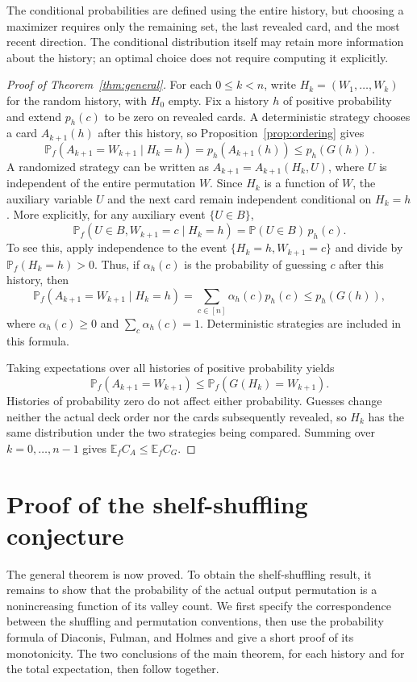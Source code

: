 \documentclass[11pt,reqno]{amsart}
\numberwithin{equation}{section}
\theoremstyle{definition}
\theoremstyle{remark}
\begin{document}
The conditional probabilities are defined using the entire history, but choosing a maximizer requires only the remaining set, the last revealed card, and the most recent direction. The conditional distribution itself may retain more information about the history; an optimal choice does not require computing it explicitly.

\begin{proof}[Proof of Theorem~\ref{thm:general}]
For each $0\le k<n$, write $H_k=(W_1,\ldots,W_k)$ for the random history, with $H_0$ empty. Fix a history $h$ of positive probability and extend $p_h(c)$ to be zero on revealed cards. A deterministic strategy chooses a card $A_{k+1}(h)$ after this history, so Proposition~\ref{prop:ordering} gives
\[
 \mathbb P_f(A_{k+1}=W_{k+1}\mid H_k=h)
 =p_h(A_{k+1}(h))\le p_h(G(h)).
\]
A randomized strategy can be written as $A_{k+1}=A_{k+1}(H_k,U)$, where $U$ is independent of the entire permutation $W$. Since $H_k$ is a function of $W$, the auxiliary variable $U$ and the next card remain independent conditional on $H_k=h$. More explicitly, for any auxiliary event $\{U\in B\}$,
\[
 \mathbb P_f(U\in B,W_{k+1}=c\mid H_k=h)
 =\mathbb P(U\in B)\,p_h(c).
\]
To see this, apply independence to the event $\{H_k=h,W_{k+1}=c\}$ and divide by $\mathbb P_f(H_k=h)>0$. Thus, if $\alpha_h(c)$ is the probability of guessing $c$ after this history, then
\[
 \mathbb P_f(A_{k+1}=W_{k+1}\mid H_k=h)
 =\sum_{c\in[n]}\alpha_h(c)p_h(c)
 \le p_h(G(h)),
\]
where $\alpha_h(c)\ge0$ and $\sum_c\alpha_h(c)=1$. Deterministic strategies are included in this formula.

Taking expectations over all histories of positive probability yields
\[
 \mathbb P_f(A_{k+1}=W_{k+1})
 \le\mathbb P_f(G(H_k)=W_{k+1}).
\]
Histories of probability zero do not affect either probability. Guesses change neither the actual deck order nor the cards subsequently revealed, so $H_k$ has the same distribution under the two strategies being compared. Summing over $k=0,\ldots,n-1$ gives $\mathbb E_f C_A\le\mathbb E_f C_G$.
\end{proof}
\section{Proof of the shelf-shuffling conjecture}\label{sec:application}
The general theorem is now proved. To obtain the shelf-shuffling result, it remains to show that the probability of the actual output permutation is a nonincreasing function of its valley count. We first specify the correspondence between the shuffling and permutation conventions, then use the probability formula of Diaconis, Fulman, and Holmes and give a short proof of its monotonicity. The two conclusions of the main theorem, for each history and for the total expectation, then follow together.
\end{document}
